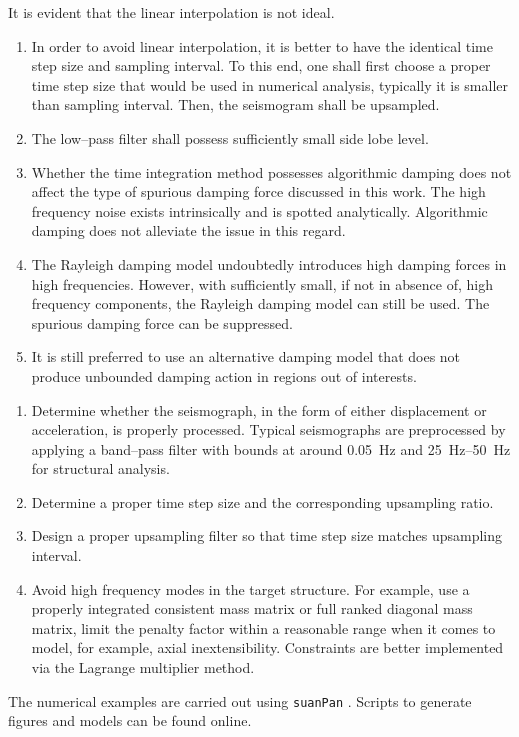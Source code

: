 It is evident that the linear interpolation is not ideal.
\begin{enumerate}
\item In order to avoid linear interpolation, it is better to have the identical time step size and sampling interval. To this end, one shall first choose a proper time step size that would be used in numerical analysis, typically it is smaller than sampling interval. Then, the seismogram shall be upsampled.
\item The low--pass filter shall possess sufficiently small side lobe level.
\item Whether the time integration method possesses algorithmic damping does not affect the type of spurious damping force discussed in this work. The high frequency noise exists intrinsically and is spotted analytically. Algorithmic damping does not alleviate the issue in this regard.
\item The Rayleigh damping model undoubtedly introduces high damping forces in high frequencies. However, with sufficiently small, if not in absence of, high frequency components, the Rayleigh damping model can still be used. The spurious damping force can be suppressed.
\item It is still preferred to use an alternative damping model that does not produce unbounded damping action in regions out of interests.
\end{enumerate}

\begin{enumerate}
\item Determine whether the seismograph, in the form of either displacement or acceleration, is properly processed. Typical seismographs are preprocessed by applying a band--pass filter with bounds at around \SI{0.05}{\hertz} and \SIrange{25}{50}{\hertz} for structural analysis.
\item Determine a proper time step size and the corresponding upsampling ratio.
\item Design a proper upsampling filter so that time step size matches upsampling interval.
\item Avoid high frequency modes in the target structure. For example, use a properly integrated consistent mass matrix or full ranked diagonal mass matrix, limit the penalty factor within a reasonable range when it comes to model, for example, axial inextensibility. Constraints are better implemented via the Lagrange multiplier method.
\end{enumerate}

The numerical examples are carried out using \texttt{suanPan} \citep{Chang2022}. Scripts to generate figures and models can be found online.
